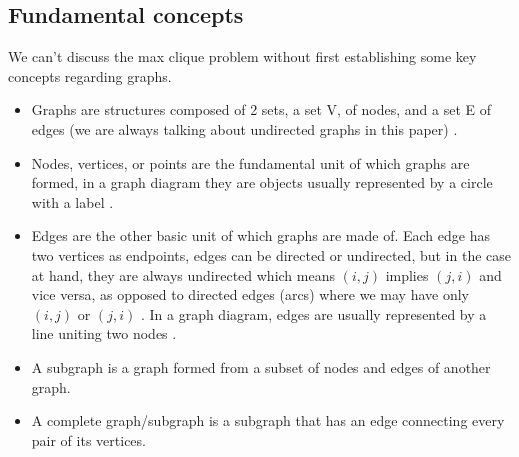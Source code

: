 \documentclass[...]{revdetua}
\begin{document}
\subsection{Fundamental concepts}
We can’t discuss the max clique problem without first establishing some key concepts regarding graphs.
\begin{itemize}
\item Graphs are structures composed of 2 sets, a set V, of nodes, and a set E of edges (we are always talking about undirected graphs in this paper) \cite{graph}.
\item Nodes, vertices, or points are the fundamental unit of which graphs are formed, in a graph diagram they are objects usually represented by a circle with a label  \cite{graph}.
\item Edges are the other basic unit of which graphs are made of. Each edge has two vertices as endpoints, edges can be directed or undirected, but in the case at hand, they are always undirected which means $(i,j)$ implies $(j,i)$ and vice versa, as opposed to directed edges (arcs) where we may have only $(i,j)$ or $(j,i)$ . In a graph diagram, edges are usually represented by a line uniting two nodes  \cite{graph}.
\item A subgraph is a graph formed from a subset of nodes and edges of another graph\cite{subgraph}.
\item A complete graph/subgraph is a subgraph that has an edge connecting every pair of its  vertices\cite{completegraph}.
\end{itemize}
\end{document}
